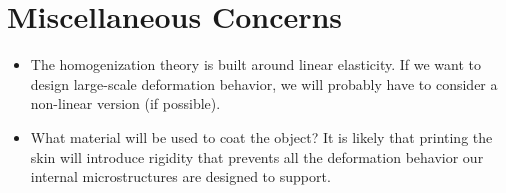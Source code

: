 \documentclass[10pt]{article}
\begin{document}
\section{Miscellaneous Concerns}
\begin{itemize}
    \item The homogenization theory is built around linear elasticity. If we want to
        design large-scale deformation behavior, we will probably have to
        consider a non-linear version (if possible).

    \item What material will be used to coat the object? It is likely that
        printing the skin will introduce rigidity that prevents all the
        deformation behavior our internal microstructures are designed to
        support.
\end{itemize}



\end{document}
